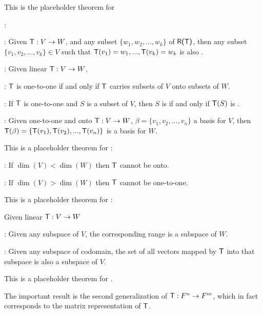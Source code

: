 \begin{additional theorem} \label{athm 2.2}
This is the placeholder theorem for

: 

: Given \(\textsf{T} : V \to W\), and any \LID{} subset \(\{ w_1, w_2, ..., w_k \}\) of \(\textsf{R(T)}\), then any subset \(\{ v_1, v_2, ..., v_k \} \in V\) such that \(\textsf{T}(v_1) = w_1, ..., \textsf{T}(v_k) = w_k\) is also \LID{}.

: Given linear \(\textsf{T} : V \to W\),

: \(\textsf{T}\) is one-to-one if and only if \(\textsf{T}\) carries \LID{} subsets of \(V\) onto \LID{} subsets of \(W\).

: If \(\textsf{T}\) is one-to-one and \(S\) is a subset of \(V\), then \(S\) is \LID{} if and only if \(\textsf{T}(S)\) is \LID{}.

: Given one-to-one and onto \(\textsf{T} : V \to W\), \(\beta = \{ v_1, v_2, ..., v_n \}\) a basis for \(V\), then\\
\(\textsf{T}(\beta) = \{ \textsf{T}(v_1), \textsf{T}(v_2), ..., \textsf{T}(v_n) \}\) is a basis for \(W\).
\end{additional theorem}

\begin{additional theorem} \label{athm 2.3}
This is a placeholder theorem for :

: If \(\dim(V) < \dim(W)\) then \(\textsf{T}\) cannot be onto.

: If \(\dim(V) > \dim(W)\) then \(\textsf{T}\) cannot be one-to-one.
\end{additional theorem}

\begin{additional theorem} \label{athm 2.4}
This is a placeholder theorem for :

Given linear \(\textsf{T} : V \to W\)

: Given any subspace of \(V\), the corresponding range is a subspace of \(W\).

: Given any subspace of codomain, the set of all vectors mapped by \(\textsf{T}\) into that subspace is also a subspace of \(V\).
\end{additional theorem}

\begin{additional theorem} \label{athm 2.5}
This is a placeholder theorem for .

The important result is the second generalization of \(\textsf{T} : F^n \to F^m\), which in fact corresponds to the matrix representation of \(\textsf{T}\).
\end{additional theorem}

